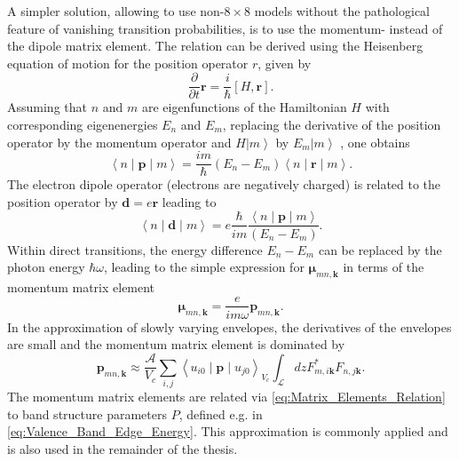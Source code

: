 A simpler solution, allowing to use non-$8\times8$ models without
the pathological feature of vanishing transition probabilities, is
to use the momentum- instead of the dipole matrix element. The relation
can be derived using the Heisenberg equation of motion for the position
operator $r$, given by\begin{equation}
\frac{\partial}{\partial t}\mathbf{r}=\frac{i}{\hbar}\left[H,\mathbf{r}\right].\end{equation}
Assuming that $n$ and $m$ are eigenfunctions of the Hamiltonian
$H$ with corresponding eigenenergies $E_{n}$ and $E_{m}$, replacing
the derivative of the position operator by the momentum operator and
$H\left|m\right\rangle $ by $E_{m}\left|m\right\rangle $ , one obtains\begin{equation}
\left\langle n\mid\mathbf{p}\mid m\right\rangle =\frac{im}{\hbar}\left(E_{n}-E_{m}\right)\left\langle n\mid\mathbf{r}\mid m\right\rangle .\end{equation}
The electron dipole operator (electrons are negatively charged) is
related to the position operator by $\mathbf{d}=e\mathbf{r}$ leading
to \begin{equation}
\left\langle n\mid\mathbf{d}\mid m\right\rangle =e\frac{\hbar}{im}\frac{\left\langle n\mid\mathbf{p}\mid m\right\rangle }{\left(E_{n}-E_{m}\right)}.\end{equation}
Within direct transitions, the energy difference $E_{n}-E_{m}$ can
be replaced by the photon energy $\hbar\omega$, leading to the simple
expression for $\boldsymbol{\mu}_{mn,\mathbf{k}}$ in terms of the
momentum matrix element\begin{equation}
\boldsymbol{\mu}_{mn,\mathbf{k}}=\frac{e}{im\omega}\mathbf{p}_{mn,\mathbf{k}}.\end{equation}
In the approximation of slowly varying envelopes, the derivatives
of the envelopes are small and the momentum matrix element is dominated
by\begin{equation}
\mathbf{p}_{mn,\mathbf{k}}\approx\frac{\mathcal{A}}{V_{c}}\sum_{i,j}\left\langle u_{i0}\mid\mathbf{p}\mid u_{j0}\right\rangle _{V_{c}}\int_{\mathcal{L}}dzF_{m,i\mathbf{k}}^{*}F_{n,j\mathbf{k}}.\label{eq:Momentum_Matrix_Element_Approx}\end{equation}
The momentum matrix elements are related via \ref{eq:Matrix_Elements_Relation}
to band structure parameters $P$, defined e.g. in \ref{eq:Valence_Band_Edge_Energy}.
This approximation is commonly applied and is also used in the remainder
of the thesis.

